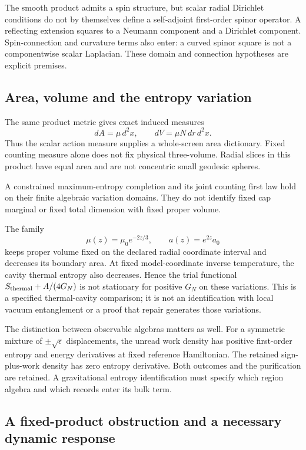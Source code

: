 The smooth product admits a spin structure, but scalar radial Dirichlet
conditions do not by themselves define a self-adjoint first-order spinor
operator. A reflecting extension squares to a Neumann component
and a Dirichlet component. Spin-connection and curvature terms also enter:
a curved spinor square is not a componentwise scalar Laplacian. These
domain and connection hypotheses are explicit premises.

\subsection{Area, volume and the entropy variation}

The same product metric gives exact induced measures
\[
 dA=\mu\,d^2x,\qquad dV=\mu N\,dr\,d^2x.
\]
Thus the scalar action measure supplies a whole-screen area dictionary.
Fixed counting measure alone does not fix physical three-volume. Radial
slices in this product have equal area and are not concentric small
geodesic spheres.

A constrained maximum-entropy completion and its joint counting first law
hold on their finite algebraic variation domains. They do not identify fixed
cap marginal or fixed total dimension with fixed proper volume.

The family
\[
 \mu(z)=\mu_0e^{-2z/3},\qquad a(z)=e^{2z}a_0
\]
keeps proper volume fixed on the declared radial coordinate interval and
decreases its boundary area. At fixed model-coordinate inverse temperature,
the cavity thermal entropy also decreases. Hence the trial functional
\(S_{\rm thermal}+A/(4G_N)\) is not stationary for positive \(G_N\) on
these variations. This is a specified thermal-cavity comparison; it is not
an identification with local vacuum entanglement or a proof that repair
generates those variations.

The distinction between observable algebras matters as well. For a
symmetric mixture of \(\pm\sqrt\epsilon\) displacements, the
unread work density has positive first-order entropy and energy derivatives
at fixed reference Hamiltonian. The retained sign-plus-work density has
zero entropy derivative. Both outcomes and the purification are retained.
A gravitational entropy identification must specify which region algebra
and which records enter its bulk term.

\subsection{A fixed-product obstruction and a necessary dynamic response}

